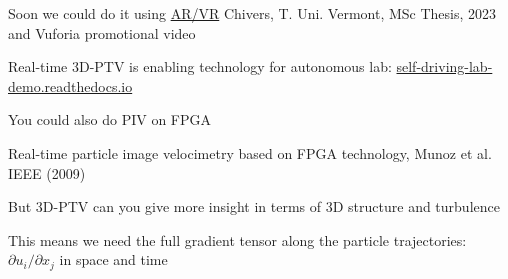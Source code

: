 \begin{frame}[label=app-31a]{Soon we could do it using \href{https://www.dropbox.com/s/ckis9r6omd5y4fq/vuforia.mp4?raw=1}{AR/VR}}
    \centering 
    Chivers, T. Uni. Vermont, MSc Thesis, 2023 and Vuforia promotional video
\end{frame}

\begin{frame}[label=app-31b]{Real-time 3D-PTV is enabling technology for autonomous lab: \href{https://self-driving-lab-demo.readthedocs.io/en/latest/index.html}{self-driving-lab-demo.readthedocs.io}}
    \centering {}
\end{frame}
        
    
%    

%

\begin{frame}[label=app-20]{You could also do PIV on FPGA}
    \centering {}
    \begin{cardTiny}
    Real-time particle image velocimetry based on FPGA technology, Munoz et al. IEEE (2009)
    \end{cardTiny}
\end{frame}

    
\begin{frame}[label=app-17a]{But 3D-PTV can you give more insight in terms of 3D structure and turbulence}
    \begin{cardTiny} 
    This means we need  the \alert{full gradient tensor} along the particle trajectories:
    $\partial u_{i}/\partial x_{j}$ in space and time
    \end{cardTiny}
    \begin{multicols}{2}
    \centering
    \end{multicols}
\end{frame}
